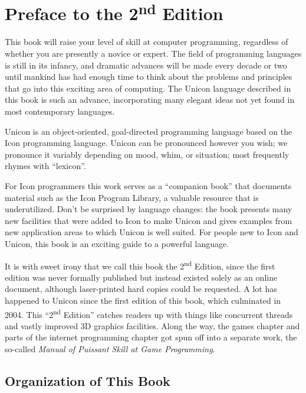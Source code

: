 \chapter{Preface to the 2\textsuperscript{nd} Edition}

This book will raise your level of skill at computer programming,
regardless of whether you are presently a novice or expert. The field
of programming languages is still in its infancy, and dramatic advances
will be made every decade or two until mankind has had enough time to
think about the problems and principles that go into this exciting area
of computing. The Unicon language described in this book is such an
advance, incorporating many elegant ideas not yet found in most
contemporary languages.

Unicon is an object-oriented, goal-directed programming language based
on the Icon programming language. Unicon can be pronounced however you
wish; we pronounce it variably depending on mood, whim, or situation;
most frequently rhymes with ``lexicon''.

For Icon programmers this work serves as a ``companion book'' that documents
material such as the Icon Program Library, a valuable resource that is
underutilized.  Don't be surprised by language changes: the book presents many
new facilities that were added to Icon to make Unicon and gives examples from
new application areas to which Unicon is well suited. For people new to Icon
and Unicon, this book is an exciting guide to a powerful language.

It is with sweet irony that we call this book the 2\textsuperscript{nd}
Edition, since the first edition was never formally published but
instead existed solely as an online document, although laser-printed
hard copies could be requested. A lot has happened to Unicon since the
first edition of this book, which culminated in 2004. This
{\textquotedblleft}2\textsuperscript{nd} Edition{\textquotedblright}
catches readers up with things like concurrent threads and vastly
improved 3D graphics facilities. Along the way, the games chapter and
parts of the internet programming chapter got spun off into a separate
work, the so-called \textit{Manual of Puissant Skill at Game
Programming}. 

\section*{Organization of This Book}

